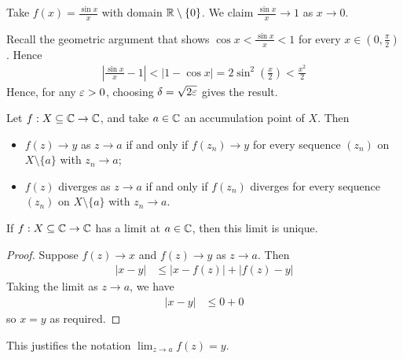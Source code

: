 \documentclass{../../template/note}
\begin{document}
    \begin{example}
        Take \(f(x) = \frac{\sin x}{x}\) with domain \(\mathbb R \setminus \{0\}\). We claim \(\frac{\sin x}{x} \to 1\) as \(x \to 0\).
        
        Recall the geometric argument that shows \(\cos x < \frac{\sin x}{x} < 1\) for every \(x \in (0, \frac{\pi}2)\). Hence
        \begin{align*}
            \left|\frac{\sin x}x - 1\right| < \left|1-\cos x\right| = 2\sin^2\left(\frac x 2\right) < \frac{x^2}{2}
        \end{align*}
        Hence, for any \(\varepsilon > 0\), choosing \(\delta = \sqrt{2\varepsilon}\) gives the result.
    \end{example}
    
    \begin{lemma}
        Let \(f: X \subseteq \mathbb C \to \mathbb C\), and take \(a \in \mathbb C\) an accumulation point of \(X\). Then
        \begin{itemize}
            \item \(f(z) \to y\) as \(z \to a\) if and only if \(f(z_n) \to y\) for every sequence \((z_n)\) on \(X \setminus \{a\}\) with \(z_n \to a\);
            \item \(f(z)\) diverges as \(z \to a\) if and only if \(f(z_n)\) diverges for every sequence \((z_n)\) on \(X \setminus \{a\}\) with \(z_n \to a\).
        \end{itemize}
    \end{lemma}
    
    \begin{lemma}
        If \(f: X \subseteq \mathbb C \to \mathbb C\) has a limit at \(a \in \mathbb C\), then this limit is unique.
    \end{lemma}

    \begin{proof}
        Suppose \(f(z) \to x\) and \(f(z) \to y\) as \(z \to a\). Then
        \begin{align*}
            |x-y| &\leq |x-f(z)| + |f(z)-y|
        \end{align*}
        Taking the limit as \(z \to a\), we have
        \begin{align*}
            |x-y| &\leq 0 + 0
        \end{align*}
        so \(x=y\) as required.        
    \end{proof}    
    
    \begin{remark*}
        This justifies the notation \(\lim_{z \to a} f(z) = y\).
    \end{remark*}
    
\end{document}
